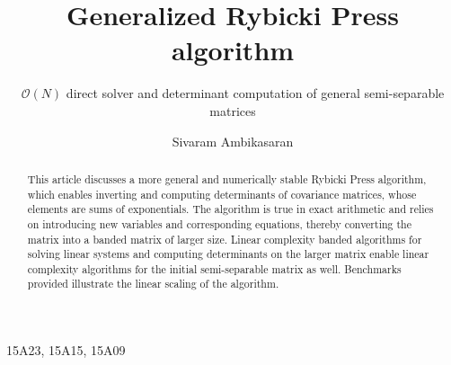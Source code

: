 \documentclass[final,leqno]{siamltex}
\title{Generalized Rybicki Press algorithm}
\subtitle{$\mathcal{O}(N)$ direct solver and determinant computation of general semi-separable matrices}
\author{Sivaram Ambikasaran}
\begin{document}
\maketitle

\begin{abstract}
This article discusses a more general and numerically stable Rybicki Press algorithm, which enables inverting and computing determinants of covariance matrices, whose elements are sums of exponentials. The algorithm is true in exact arithmetic and relies on introducing new variables and corresponding equations, thereby converting the matrix into a banded matrix of larger size. Linear complexity banded algorithms for solving linear systems and computing determinants on the larger matrix enable linear complexity algorithms for the initial semi-separable matrix as well. Benchmarks provided illustrate the linear scaling of the algorithm.
\end{abstract}

\begin{keywords}
\end{keywords}


\begin{AMS}
15A23, 15A15, 15A09
\end{AMS}

\pagestyle{myheadings}
\thispagestyle{plain}
\end{document}
